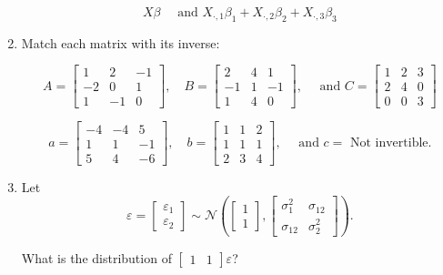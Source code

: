 \documentclass[12pt]{article}
\begin{document}
\begin{enumerate}
  $$
    X \beta \quad \text{ and } 
    X_{\cdot, 1} \beta_1 + X_{\cdot, 2} \beta_2 + X_{\cdot, 3} \beta_3 
  $$

  
  \newpage
  \item Match each matrix with its inverse:
  
  $$
    A = \begin{bmatrix} 1 & 2 & -1 \\ -2 & 0 & 1 \\ 1 & -1 & 0 \end{bmatrix}, 
    \quad 
    B = \begin{bmatrix} 2 & 4 & 1 \\ -1 & 1 & -1 \\ 1 & 4 & 0 \end{bmatrix}, 
    \quad \text{ and } 
    C = \begin{bmatrix}  1 & 2 & 3 \\ 2 & 4 & 0 \\ 0 & 0 & 3 \end{bmatrix}
  $$
  
  $$
    a = \begin{bmatrix} -4 & -4 & 5 \\ 1 & 1 & -1 \\ 5 & 4 & -6 \end{bmatrix}, 
    \quad 
    b = \begin{bmatrix} 1 & 1 & 2 \\ 1 & 1 & 1 \\ 2 & 3 & 4\end{bmatrix}, 
    \quad \text{ and } 
    c = \text{ Not invertible}.
  $$


  \bigskip\bigskip
  \item Let $$
    \varepsilon = \begin{bmatrix}\varepsilon_1 \\ \varepsilon_2\end{bmatrix} \sim \mathcal{N}\left( \begin{bmatrix}1 \\ 1\end{bmatrix}, \begin{bmatrix}\sigma_1^2 & \sigma_{12} \\ \sigma_{12} & \sigma_2^2\end{bmatrix} \right).
  $$
  
  What is the distribution of $\begin{bmatrix} 1 & 1 \end{bmatrix} \varepsilon$?


\end{enumerate}
\end{document}
